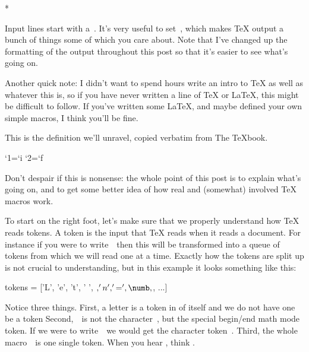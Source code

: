*
\stoptyping

Input lines start with a~\type{*}. It's very useful to
set~, which makes TeX output a bunch of things some
of which you care about. Note that I've changed up the formatting of the
output throughout this post so that it's easier to see what's going on.

Another quick note: I didn't want to spend hours write an intro to TeX
as well as whatever this is, so if you have never written a line of TeX
or LaTeX, this might be difficult to follow. If you've written some
LaTeX, and maybe defined your own simple macros, I think you'll be fine.

\stopsectionlevel

\stopsectionlevel

\startsectionlevel[title={The Goal},reference={the-goal}]

This is the definition we'll unravel, copied verbatim from The TeXbook.

\starttyping
\outer\def\newif#1{\count@=\escapechar \escapechar=-1
  \expandafter\expandafter\expandafter
   \def\@if#1{true}{\let#1=\iftrue}%
  \expandafter\expandafter\expandafter
   \def\@if#1{false}{\let#1=\iffalse}%
  \@if#1{false}\escapechar=\count@} %
\def\@if#1#2{\csname\expandafter\if@\string#1#2\endcsname}
{\uccode`1=`i \uccode`2=`f \uppercase{\gdef\if@12{}}} %
\stoptyping

Don't despair if this is nonsense: the whole point of this post is to
explain what's going on, and to get some better idea of how real and
(somewhat) involved TeX macros work.

\stopsectionlevel

\startsectionlevel[title={How TeX Reads
Tokens},reference={how-tex-reads-tokens}]

To start on the right foot, let's make sure that we properly understand
how TeX reads tokens. A token is the input  that TeX
reads when it reads a document. For instance if you were to
write~~then this will be transformed
into a queue of tokens from which we will read one at a time. Exactly
how the tokens are split up is not crucial to understanding, but in this
example it looks something like this:

\starttyping
tokens = ['L', 'e', 't', ' ', $, 'n', '=', \numb, $, ...]
\stoptyping

Notice three things. First, a letter is a token in of itself and we do
not have one  be a token Second,~\type{$}~is not the
character~, but the special begin/end math mode token. If we
were to write~\type{\$}~we would get the character token~.
Third, the whole macro~\type{\numb}~is one single token. When you hear
, think .

